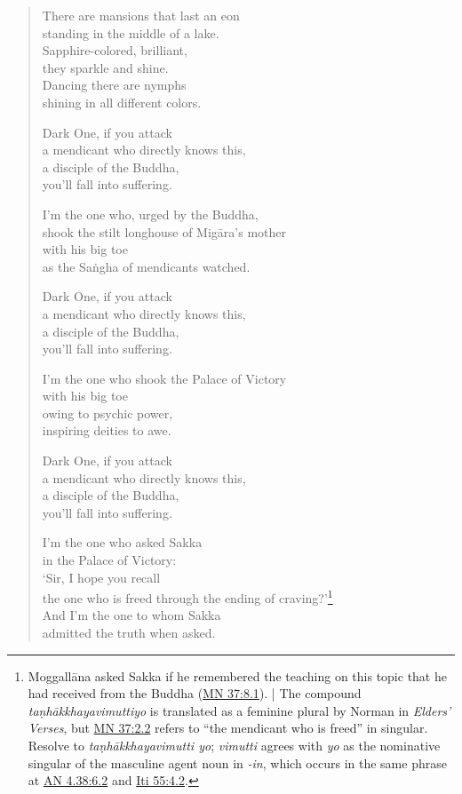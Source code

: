 \documentclass[12pt,openany]{book}%
\begin{document}
\begin{verse}
There are mansions that last an eon \\
standing in the middle of a lake. \\
Sapphire-colored, brilliant, \\
they sparkle and shine. \\
Dancing there are nymphs \\
shining in all different colors. 

Dark One, if you attack \\
a mendicant who directly knows this, \\
a disciple of the Buddha, \\
you’ll fall into suffering. 

I’m the one who, urged by the Buddha, \\
shook the stilt longhouse of \textsanskrit{Migāra}’s mother \\
with his big toe \\
as the \textsanskrit{Saṅgha} of mendicants watched. 

Dark One, if you attack \\
a mendicant who directly knows this, \\
a disciple of the Buddha, \\
you’ll fall into suffering. 

I’m the one who shook the Palace of Victory \\
with his big toe \\
owing to psychic power, \\
inspiring deities to awe. 

Dark One, if you attack \\
a mendicant who directly knows this, \\
a disciple of the Buddha, \\
you’ll fall into suffering. 

I’m the one who asked Sakka \\
in the Palace of Victory: \\
‘Sir, I hope you recall \\
the one who is freed through the ending of craving?’\footnote{\textsanskrit{Moggallāna} asked Sakka if he remembered the teaching on this topic that he had received from the Buddha (\href{https://suttacentral.net/mn37/en/sujato\#8.1}{MN 37:8.1}). | The compound \textit{\textsanskrit{taṇhākkhayavimuttiyo}} is translated as a feminine plural by Norman in \emph{Elders’ Verses}, but \href{https://suttacentral.net/mn37/en/sujato\#2.2}{MN 37:2.2} refers to “the mendicant who is freed” in singular. Resolve to \textit{\textsanskrit{taṇhākkhayavimutti} yo}; \textit{vimutti} agrees with \textit{yo} as the nominative singular of the masculine agent noun in \textit{-in}, which occurs in the same phrase at \href{https://suttacentral.net/an4.38/en/sujato\#6.2}{AN 4.38:6.2} and \href{https://suttacentral.net/iti55/en/sujato\#4.2}{Iti 55:4.2}. } \\
And I’m the one to whom Sakka \\
admitted the truth when asked. 


\end{verse}
\end{document}
